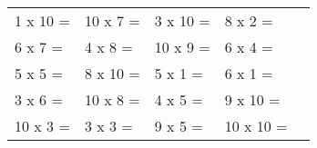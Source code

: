 \begin{table}[ht] 
\begin{tabular}{ M{3cm} M{3.5cm} M{3,5cm} M{3.5cm} N }
1 x 10 =    & 10 x 7 =   & 3 x 10 =    &   8 x 2 =        &\\[1em] 
6 x 7 =    & 4 x 8 =   & 10 x 9 =    &   6 x 4 =        &\\[1em] 
5 x 5 =    & 8 x 10 =   & 5 x 1 =    &   6 x 1 =        &\\[1em] 
3 x 6 =    & 10 x 8 =   & 4 x 5 =    &   9 x 10 =        &\\[1em] 
10 x 3 =    & 3 x 3 =   & 9 x 5 =    &   10 x 10 =        &\\[1em] 
\end{tabular}\end{table} 
\newpage